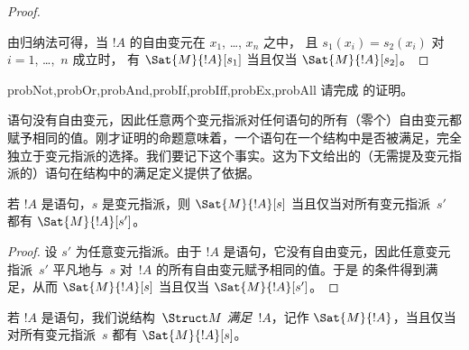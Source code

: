 \documentclass[../../../include/open-logic-section]{subfiles}
\begin{document}
\begin{proof}
\begin{enumerate}
\end{enumerate}
由归纳法可得，当 $!A$ 的自由变元在 $x_1$, \dots, $x_n$ 之中，
且 $s_1(x_i)=s_2(x_i)$ 对 $i = 1$, \dots,~$n$ 成立时，
有 $\Sat{M}{!A}[s_1]$ 当且仅当 $\Sat{M}{!A}[s_2]$。
\end{proof}

\begin{probtag}{probNot,probOr,probAnd,probIf,probIff,probEx,probAll}
请完成  的证明。
\end{probtag}

\begin{explain}
语句没有自由变元，因此任意两个变元指派对任何语句的所有（零个）自由变元都赋予相同的值。刚才证明的命题意味着，一个语句在一个结构中是否被满足，完全独立于变元指派的选择。我们要记下这个事实。这为下文给出的（无需提及变元指派的）语句在结构中的满足定义提供了依据。
\end{explain}

\begin{cor}
若 $!A$ 是语句，$s$ 是变元指派，则 $\Sat{M}{!A}[s]$ 当且仅当对所有变元指派~$s'$ 都有 $\Sat{M}{!A}[s']$。
\end{cor}

\begin{proof}
  设 $s'$ 为任意变元指派。由于 $!A$ 是语句，它没有自由变元，因此任意变元指派~$s'$ 平凡地与~$s$ 对~$!A$ 的所有自由变元赋予相同的值。于是  的条件得到满足，从而 $\Sat{M}{!A}[s]$ 当且仅当 $\Sat{M}{!A}[s']$。
\end{proof}

\begin{defn}
若 $!A$ 是语句，我们说结构~$\Struct M$ \emph{满足}~$!A$，记作 $\Sat{M}{!A}$，当且仅当对所有变元指派~$s$ 都有 $\Sat{M}{!A}[s]$。
\end{defn}
\end{document}
